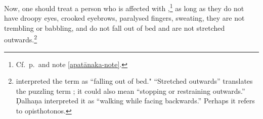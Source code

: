 \begin{translation}
Now, one should treat a person who is affected with
,\footnote{Cf.\ p.\,\pageref{apatānaka} and note
    \ref{apatānaka-note}.} as long as they do not have droopy eyes, crooked
    eyebrows, paralysed fingers, sweating, they are not trembling or babbling,
    and do not fall out of bed and are not stretched
    outwards.\footnote{ interpreted the term
         as “falling out of bed." “Stretched outwards” translates
        the puzzling term ; it could also mean “stopping or
        restraining outwards.” Ḍalhaṇa interpreted it as  
        “walking while facing backwards.”  Perhaps it refers to opisthotonos.}

\end{translation}

